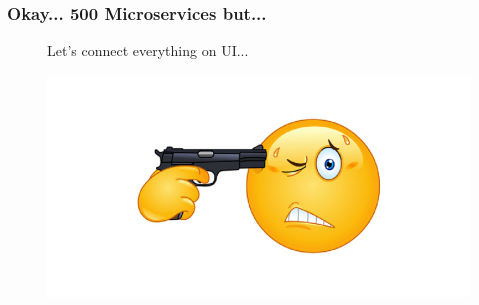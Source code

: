 \begin{frame}
\frametitle{Okay... 500 Microservices but...}
\begin{figure}
Let's connect everything on UI...\pause
\end{figure}
\begin{figure}
	\centering
	\includegraphics[width=0.7\linewidth]{pictures/killme}
	\label{fig:killme}
\end{figure}


\end{frame}
